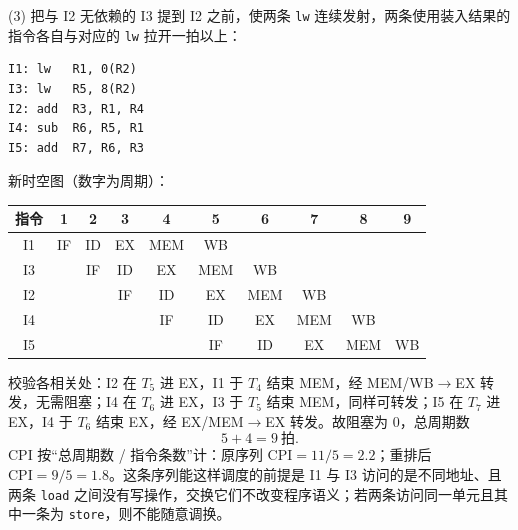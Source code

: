 \begin{enumerate}[resume]
(3) 把与 I2 无依赖的 I3 提到 I2 之前，使两条 \texttt{lw} 连续发射，两条使用装入结果的指令各自与对应的 \texttt{lw} 拉开一拍以上：
\begin{lstlisting}
I1: lw   R1, 0(R2)
I3: lw   R5, 8(R2)
I2: add  R3, R1, R4
I4: sub  R6, R5, R1
I5: add  R7, R6, R3
\end{lstlisting}
新时空图（数字为周期）：
\begin{center}
\setlength{\tabcolsep}{4.2pt}
\small
\begin{tabular}{|c|c|c|c|c|c|c|c|c|c|}
\hline
指令 & 1 & 2 & 3 & 4 & 5 & 6 & 7 & 8 & 9 \\
\hline
I1 & IF & ID & EX & MEM & WB & & & & \\
\hline
I3 & & IF & ID & EX & MEM & WB & & & \\
\hline
I2 & & & IF & ID & EX & MEM & WB & & \\
\hline
I4 & & & & IF & ID & EX & MEM & WB & \\
\hline
I5 & & & & & IF & ID & EX & MEM & WB \\
\hline
\end{tabular}
\end{center}
校验各相关处：I2 在 $T_5$ 进 EX，I1 于 $T_4$ 结束 MEM，经 MEM/WB$\to$EX 转发，无需阻塞；I4 在 $T_6$ 进 EX，I3 于 $T_5$ 结束 MEM，同样可转发；I5 在 $T_7$ 进 EX，I4 于 $T_6$ 结束 EX，经 EX/MEM$\to$EX 转发。故阻塞为 0，总周期数
\[
5+4=9\ \text{拍}.
\]
CPI 按“总周期数 / 指令条数”计：原序列 $\mathrm{CPI}=11/5=2.2$；重排后 $\mathrm{CPI}=9/5=1.8$。这条序列能这样调度的前提是 I1 与 I3 访问的是不同地址、且两条 \texttt{load} 之间没有写操作，交换它们不改变程序语义；若两条访问同一单元且其中一条为 \texttt{store}，则不能随意调换。

\else \answerarea[14] \fi

\end{enumerate}

\vspace{8pt}

